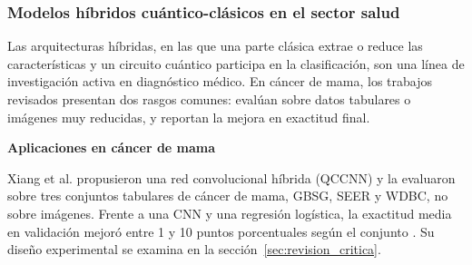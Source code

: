 
\subsubsection{Modelos híbridos cuántico-clásicos en el sector salud}

Las arquitecturas híbridas, en las que una parte clásica extrae o reduce las características y un circuito cuántico participa en la clasificación, son una línea de investigación activa en diagnóstico médico. En cáncer de mama, los trabajos revisados presentan dos rasgos comunes: evalúan sobre datos tabulares o imágenes muy reducidas, y reportan la mejora en exactitud final.

\textbf{Aplicaciones en cáncer de mama}

Xiang et al. propusieron una red convolucional híbrida (QCCNN) y la evaluaron sobre tres conjuntos tabulares de cáncer de mama, GBSG, SEER y WDBC, no sobre imágenes. Frente a una CNN y una regresión logística, la exactitud media en validación mejoró entre 1 y 10 puntos porcentuales según el conjunto \cite{Xiang2024QuantumCNN}. Su diseño experimental se examina en la sección~\ref{sec:revision_critica}.


